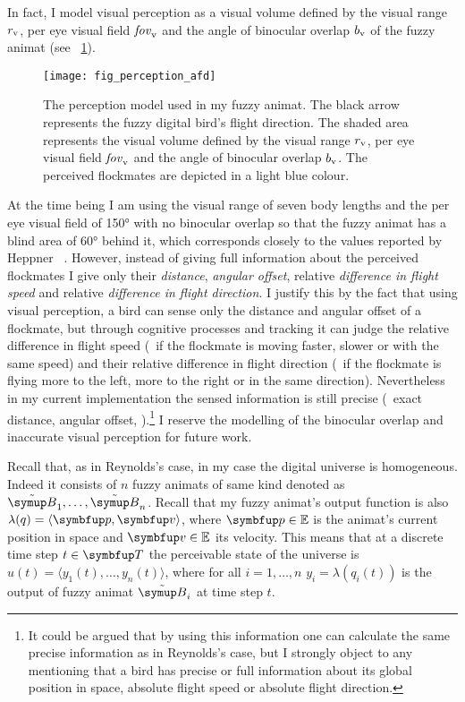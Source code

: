 In fact, I model visual perception as a visual volume defined by the visual range $r_\textnormal{v}$, per eye visual field $\mathit{fov}_\textnormal{v}$ and the angle of binocular overlap $b_\textnormal{v}$ of the fuzzy animat (see \fig~\ref{fig:perception:afd}).
%
\begin{figure}
	\texttt{[image: fig\_perception\_afd]}
	\caption{The perception model used in my fuzzy animat. The black arrow represents the fuzzy digital bird's flight direction. The shaded area represents the visual volume defined by the visual range $r_\textnormal{v}$, per eye visual field $\mathit{fov}_\textnormal{v}$ and the angle of binocular overlap $b_\textnormal{v}$. The perceived flockmates are depicted in a light blue colour.}
	\label{fig:perception:afd}
\end{figure}
%
At the time being I am using the visual range of seven body lengths and the per eye visual field of \ang{150} with no binocular overlap so that the fuzzy animat has a blind area of \ang{60} behind it, which corresponds closely to the values reported by Heppner \etal\ \cite{heppner:1985}. However, instead of giving full information about the perceived flockmates I give only their \emph{distance}, \emph{angular offset}, relative \emph{difference in flight speed} and relative \emph{difference in flight direction}. I justify this by the fact that using visual perception, a bird can sense only the distance and angular offset of a flockmate, but through cognitive processes and tracking it can judge the relative difference in flight speed (\ie\ if the flockmate is moving faster, slower or with the same speed) and their relative difference in flight direction (\ie\ if the flockmate is flying more to the left, more to the right or in the same direction). Nevertheless in my current implementation the sensed information is still precise (\ie\ exact distance, angular offset, \etc).\footnote{It could be argued that by using this information one can calculate the same precise information as in Reynolds's \cite{reynolds:1999} case, but I strongly object to any mentioning that a bird has precise or full information about its global position in space, absolute flight speed or absolute flight direction.} I reserve the modelling of the binocular overlap and inaccurate visual perception for future work.

Recall that, as in Reynolds's case, in my case the digital universe is homogeneous. Indeed it consists of $n$ fuzzy animats of same kind denoted as $\fautom{B}_1,\ldots,\fautom{B}_n$. Recall that my fuzzy animat's output function is also $\lambda(q)=\langle \vect{p}, \vect{v} \rangle$, where $\vect{p} \in \E$ is the animat's current position in space and $\vect{v} \in \E$ its velocity. This means that at a discrete time step $t \in \set{T}$ the perceivable state of the universe is $u(t)=\langle y_1(t),\ldots,y_n(t) \rangle$, where for all $i=1,\ldots,n$ $y_i=\lambda(q_i(t))$ is the output of fuzzy animat $\fautom{B}_i$ at time step $t$.

